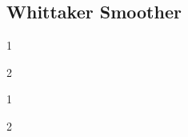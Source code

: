 

\subsection{Whittaker Smoother}
\label{sec:whittaker}
\begin{my_pros_cons_table}{
    \item 1
    \item 2
  }{
    \item 1
    \item 2
  }
\end{my_pros_cons_table}


